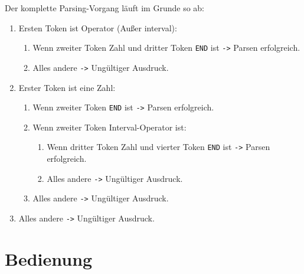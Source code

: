 \documentclass[a4paper,12pt]{article}
\begin{document}
Der komplette Parsing-Vorgang läuft im Grunde so ab:

\begin{enumerate}
	\item Ersten Token ist Operator (Außer interval):
	\begin{enumerate}
		\item Wenn zweiter Token Zahl und dritter Token \texttt{END} ist \verb+->+ Parsen erfolgreich.
		\item Alles andere \verb+->+ Ungültiger Ausdruck.
	\end{enumerate}
	\item Erster Token ist eine Zahl:
	\begin{enumerate}
		\item Wenn zweiter Token \texttt{END} ist \verb+->+ Parsen erfolgreich.
		\item Wenn zweiter Token Interval-Operator ist:
		\begin{enumerate}
			\item Wenn dritter Token Zahl und vierter Token \texttt{END} ist \verb+->+ Parsen erfolgreich.
			\item Alles andere \verb+->+ Ungültiger Ausdruck.
		\end{enumerate}
		\item Alles andere \verb+->+ Ungültiger Ausdruck.
	\end{enumerate}
	\item Alles andere \verb+->+ Ungültiger Ausdruck.
\end{enumerate}

\section*{Bedienung}
\end{document}
